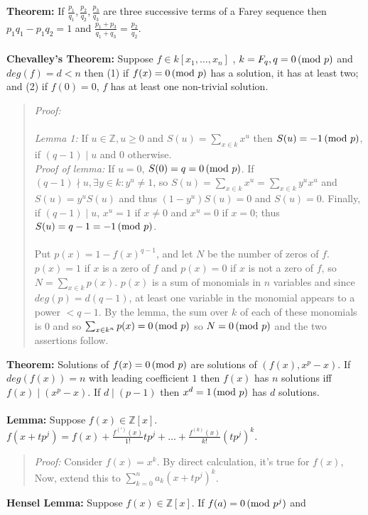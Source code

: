 {\bf Theorem:} If 
$ {\frac {p_1} {q_1}}, {\frac {p_2} {q_2}}, {\frac {p_3} {q_3}}$ are three successive terms
of a Farey sequence then $p_1 q_1 - p_1 q_2 =1$ and 
${\frac {p_1 + p_3} {q_1 + q_3}}= {\frac {p_2} {q_2}}$.
\\
\\
{\bf Chevalley's Theorem:} Suppose $f \in k[x_1, \ldots, x_n]$ , $k= F_q, q=0 \thinspace \textnormal{(mod } p \textnormal{)}$ and
$deg(f)=d<n$
then (1) if $f(x)= 0 \thinspace \textnormal{(mod } p \textnormal{)}$ has a solution, it has at least two; and (2) if $f(0)=0$,
$f$ has at least one non-trivial solution.
\begin{quote}
\emph{Proof:}
\\
\\
\emph{Lemma 1:}  If $u \in {\mathbb Z}, u \geq 0$ and $S(u)= \sum_{x \in k} x^u$ then $S(u)= -1 \thinspace \textnormal{(mod } p \textnormal{)}$, 
if $(q-1) \mid u$ and $0$ otherwise.
\\
\emph{Proof of lemma:} If $u=0$, $S(0) = q = 0 \thinspace \textnormal{(mod } p \textnormal{)}$.  If $(q-1) \nmid u, \exists y \in k: y^u \neq 1$, so
$S(u)= \sum_{x \in k} x^u = \sum_{x \in k} y^u x^u$ and $S(u)= y^u S(u)$ and thus $(1-y^u)S(u)= 0$ and $S(u)= 0$.
Finally, if $(q-1) \mid u$, $x^u = 1$ if $x \neq 0$ and $x^u= 0$ if $x=0$; thus $S(u)= q-1 = -1 \thinspace \textnormal{(mod } p \textnormal{)}$.
\\
\\
Put $p(x)= 1-f(x)^{q-1}$, and let $N$ be the number of zeros of $f$.
$p(x)= 1$ if $x$ is a zero of $f$ and $p(x)= 0$ if $x$ is not a zero of $f$, so $N= \sum_{x \in k} p(x) $.
$p(x)$ is a sum of monomials in $n$ variables and since $deg(p)= d(q-1)$, at least one variable in the monomial appears
to a power $<q-1$.   
By the lemma, the sum over $k$ of each of these monomials is $0$ and so $\sum_{x \in k^n} p(x)= 0 \thinspace \textnormal{(mod } p \textnormal{)}$ so
$N= 0 \thinspace \textnormal{(mod } p \textnormal{)}$ and the two assertions follow.
\end{quote}
{\bf Theorem:}
Solutions of $f(x)= 0 \thinspace \textnormal{(mod } p \textnormal{)}$ are solutions of $(f(x), x^p-x)$.
If $deg(f(x)) = n$ with leading coefficient $1$ then $f(x)$ has $n$ solutions
iff $f(x) \mid (x^p - x)$.  If $d \mid (p-1)$ then $x^d = 1 \thinspace \textnormal{(mod } p \textnormal{)}$ has $d$ solutions.
\\
\\
{\bf Lemma:}  Suppose $f(x) \in {\mathbb Z} [x]$.
$f(x+tp^j) = f(x) + {\frac {f^{(')}(x)} {1!}} tp^j + \ldots + {\frac {f^{(k)}(x)} {k!}} (tp^j)^k$.
\begin{quote}
\emph{Proof:} 
Consider $f(x)= x^k$.  By direct calculation, it's true for $f(x)$, Now, extend this to
$\sum_{k=0}^n a_k (x+tp^j)^k$.
\end{quote}
{\bf Hensel Lemma:}  Suppose $f(x) \in {\mathbb Z} [x]$.  If $f(a) = 0 \thinspace \textnormal{(mod } p^j \textnormal{)}$ and
